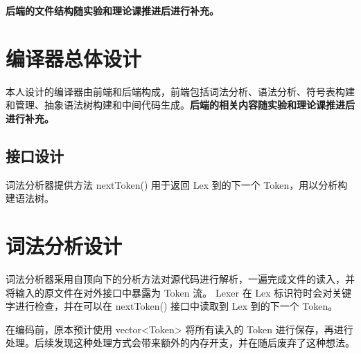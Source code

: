 \documentclass[a4paper]{article}
\begin{document}
	\textbf{后端的文件结构随实验和理论课推进后进行补充。}
	
	\section{编译器总体设计}
	
	本人设计的编译器由前端和后端构成，前端包括词法分析、语法分析、符号表构建和管理、抽象语法树构建和中间代码生成。\textbf{后端的相关内容随实验和理论课推进后进行补充。}
	
	\subsection{接口设计}
	
	词法分析器提供方法 nextToken() 用于返回 Lex 到的下一个 Token，用以分析构建语法树。
	
	\section{词法分析设计}
	
	词法分析器采用自顶向下的分析方法对源代码进行解析，一遍完成文件的读入，并将输入的原文件在对外接口中暴露为 Token 流。 
	Lexer 在 Lex 标识符时会对关键字进行检查，并在可以在 nextToken() 接口中读取到 Lex 到的下一个 Token。
	
	在编码前，原本预计使用 vector<Token> 将所有读入的 Token 进行保存，再进行处理。后续发现这种处理方式会带来额外的内存开支，并在随后废弃了这种想法。
	
	
	
	
	
	
	
\end{document}

